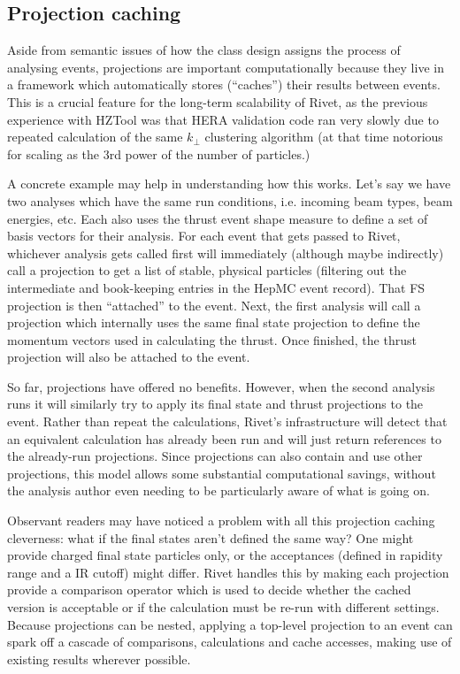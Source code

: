 \documentclass{JHEP3}
\begin{document}
\subsection{Projection caching}

Aside from semantic issues of how the class design assigns the process of
analysing events, projections are important computationally because they live in
a framework which automatically stores (``caches'') their results between
events. This is a crucial feature for the long-term scalability of Rivet, as the
previous experience with HZTool was that HERA validation code ran very slowly
due to repeated calculation of the same $k_\perp$ clustering algorithm (at that
time notorious for scaling as the 3rd power of the number of particles.)

A concrete example may help in understanding how this works. Let's say we have
two analyses which have the same run conditions, i.e. incoming beam types, beam
energies, etc. Each also uses the thrust event shape measure to define a set of
basis vectors for their analysis. For each event that gets passed to Rivet,
whichever analysis gets called first will immediately (although maybe
indirectly) call a  projection to get a list of stable, physical
particles (filtering out the intermediate and book-keeping entries in the HepMC
event record). That FS projection is then ``attached'' to the event. Next, the
first analysis will call a  projection which internally uses the
same final state projection to define the momentum vectors used in calculating
the thrust. Once finished, the thrust projection will also be attached to the
event.

So far, projections have offered no benefits. However, when the second analysis
runs it will similarly try to apply its final state and thrust projections to
the event. Rather than repeat the calculations, Rivet's infrastructure will
detect that an equivalent calculation has already been run and will just return
references to the already-run projections. Since projections can also contain
and use other projections, this model allows some substantial computational
savings, without the analysis author even needing to be particularly aware of
what is going on.

Observant readers may have noticed a problem with all this projection caching
cleverness: what if the final states aren't defined the same way? One might
provide charged final state particles only, or the acceptances (defined in
rapidity range and a IR \pT cutoff) might differ. Rivet handles this by
making each projection provide a comparison operator which is used to decide
whether the cached version is acceptable or if the calculation must be re-run
with different settings. Because projections can be nested, applying a top-level
projection to an event can spark off a cascade of comparisons, calculations and
cache accesses, making use of existing results wherever possible.
\end{document}
